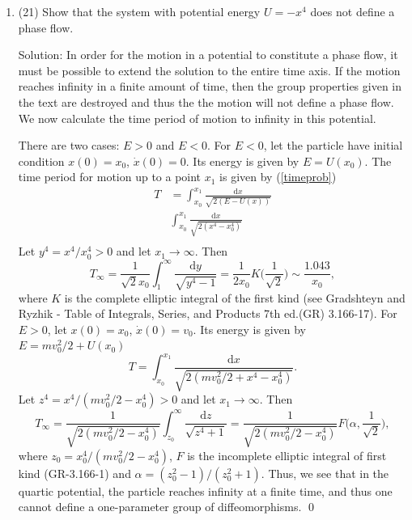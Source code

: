 \begin{enumerate}
\item (21) Show that the system with potential energy $U = - x^4$ does not define a phase flow.\par
Solution: In order for the motion in a potential to constitute a phase flow, it must be possible to extend the solution to the entire time axis. If the motion reaches infinity in a finite amount of time, then the group properties given in the text are destroyed and thus the the motion will not define a phase flow. We now calculate the time period of motion to infinity in this potential. \par
There are two cases: $E>0$ and $E<0$. For $E<0$, let the particle have initial condition $x(0) = x_0$, $\dot{x}(0) = 0$. Its energy is given by $E = U(x_0)$. The time period for motion up to a point $x_1$ is given by (\ref{timeprob})\begin{align}\label{key}
	T &= \int_{x_0}^{x_1}\frac{\mathrm{d}x}{\sqrt{2(E-U(x))}}\\
	&\int_{x_0}^{x_1}\frac{\mathrm{d}x}{\sqrt{2(x^4-x_0^4)}}\\
\end{align}
Let $y^4 = x^4/x_0^4>0$  and let $x_1\rightarrow\infty$. Then 
\begin{equation}
	T_{\infty} = \frac{1}{\sqrt{2}x_0}\int_{1}^\infty\frac{\mathrm{d}y}{\sqrt{y^4-1}} = \frac{1}{2x_0} K\bigg(\frac{1}{\sqrt{2}}\bigg)\sim \frac{1.043}{x_0} ,
\end{equation}
where $K$ is the complete elliptic integral of the first kind (see Gradshteyn and Ryzhik - Table of Integrals, Series, and Products 7th ed.(GR) 3.166-17). For $E>0$, let $x(0) = x_0$, $\dot{x}(0) = v_0$. Its energy is given by $E = m v_0^2/2 + U(x_0)$\begin{equation}\label{key}
	T = \int_{x_0}^{x_1}\frac{\mathrm{d}x}{\sqrt{2(mv_0^2/2+x^4-x_0^4)}}.
\end{equation}
Let $z^4 = x^4/(mv_0^2/2-x_0^4)>0$ and let $x_1\rightarrow\infty$. Then 
\begin{equation}
	T_{\infty} = \frac{1}{\sqrt{2(mv_0^2/2-x_0^4)}}\int_{z_0}^\infty\frac{\mathrm{d}z}{\sqrt{z^4+1}} = \frac{1}{\sqrt{2(mv_0^2/2-x_0^4)}} F\bigg(\alpha, \frac{1}{\sqrt{2}}\bigg),
\end{equation}
where $z_0 = x_0^4/(mv_0^2/2-x_0^4)$, $F$ is the incomplete elliptic integral of first kind (GR-3.166-1) and $\alpha = (z_0^2-1)/(z_0^2+1)$.
Thus, we see that in the quartic potential, the particle reaches infinity at a finite time, and thus one cannot define a one-parameter group of diffeomorphisms. \qed

\end{enumerate}
